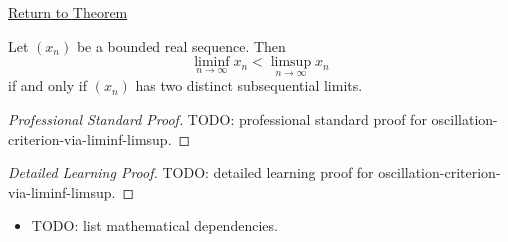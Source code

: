 \newpage
{}
\label{prf:oscillation-criterion-via-liminf-limsup}

\begin{remark*}[Return]
\hyperref[thm:oscillation-criterion-via-liminf-limsup]{Return to Theorem}
\end{remark*}

\begin{theorem*}
Let $(x_n)$ be a bounded real sequence. Then
\[
  \liminf_{n\to\infty}x_n
  <
  \limsup_{n\to\infty}x_n
\]
if and only if $(x_n)$ has two distinct subsequential limits.

\smallskip
\noindent
\end{theorem*}

\begin{proof}[Professional Standard Proof]
\LRAProofBodyStart
TODO: professional standard proof for oscillation-criterion-via-liminf-limsup.
\end{proof}

\begin{proof}[Detailed Learning Proof]
\LRAProofBodyStart
TODO: detailed learning proof for oscillation-criterion-via-liminf-limsup.
\end{proof}

\begin{remark*}
\end{remark*}

\begin{dependencies}
\begin{itemize}
  \item TODO: list mathematical dependencies.
\end{itemize}
\end{dependencies}

\clearpage
